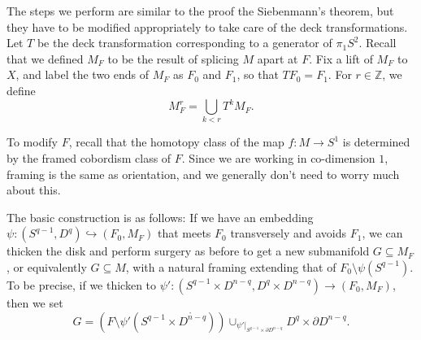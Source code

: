 \documentclass[a4paper, 12pt]{article}
\theoremstyle{definition}
\newcommand\Z{\mathbb{Z}}
\begin{document}
The steps we perform are similar to the proof the Siebenmann's theorem, but they have to be modified appropriately to take care of the deck transformations. Let $T$ be the deck transformation corresponding to a generator of $\pi_1S^2$. Recall that we defined $M_F$ to be the result of splicing $M$ apart at $F$. Fix a lift of $M_F$ to $X$, and label the two ends of $M_F$ as $F_0$ and $F_1$, so that $TF_0 = F_1$. For $r \in \Z$, we define
\[
  M_F^r = \bigcup_{k < r} T^k M_F.
\]
\begin{center}
\end{center}

To modify $F$, recall that the homotopy class of the map $f: M \to S^1$ is determined by the framed cobordism class of $F$. Since we are working in co-dimension $1$, framing is the same as orientation, and we generally don't need to worry much about this.

The basic construction is as follows: If we have an embedding $\psi: (S^{q - 1}, D^q) \hookrightarrow (F_0, M_F)$ that meets $F_0$ transversely and avoids $F_1$, we can thicken the disk and perform surgery as before to get a new submanifold $G \subseteq M_F$, or equivalently $G \subseteq M$, with a natural framing extending that of $F_0 \setminus \psi(S^{q - 1})$. To be precise, if we thicken to $\psi': (S^{q - 1} \times D^{n - q}, D^q \times D^{n - q}) \to (F_0, M_F)$, then we set
\[
  G = (F \setminus \psi'(S^{q - 1} \times \mathring{D^{n - q}})) \cup_{\psi'|_{S^{q - 1} \times \partial D^{n - q}}} D^q \times \partial D^{n - q}.
\]
\end{document}
